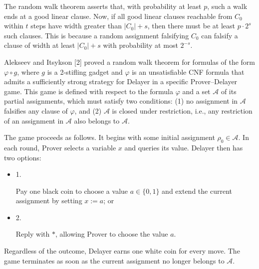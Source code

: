 \documentclass[10pt,a4paper]{article}
\begin{document}
The random walk theorem asserts that, with probability at least $p$, such a walk ends at a good linear clause. Now, if all good linear clauses reachable from $C_{0}$ within $t$ steps have width greater than $|C_{0}|+s$, then there must be at least $p\cdot 2^{s}$ such clauses. This is because a random assignment falsifying $C_{0}$ can falsify a clause of width at least $|C_{0}|+s$ with probability at most $2^{-s}$.\par



Alekseev and Itsykson [2] proved a random walk theorem for formulas of the form $\varphi\circ g$, where $g$ is a 2-stifling gadget and $\varphi$ is an unsatisfiable CNF formula that admits a sufficiently strong strategy for Delayer in a specific Prover–Delayer game. This game is defined with respect to the formula $\varphi$ and a set $\mathcal{A}$ of its partial assignments, which must satisfy two conditions: (1) no assignment in $\mathcal{A}$ falsifies any clause of $\varphi$, and (2) $\mathcal{A}$ is closed under restriction, i.e., any restriction of an assignment in $\mathcal{A}$ also belongs to $\mathcal{A}$.\par



The game proceeds as follows. It begins with some initial assignment $\rho_{0}\in\mathcal{A}$. In each round, Prover selects a variable $x$ and queries its value. Delayer then has two options:\par


\begin{itemize}


\item 
1. 


Pay one black coin to choose a value $a\in\{0,1\}$ and extend the current assignment by setting $x:=a$; or\par





\item 
2. 


Reply with $*$, allowing Prover to choose the value $a$.\par





\end{itemize}


Regardless of the outcome, Delayer earns one white coin for every move. The game terminates as soon as the current assignment no longer belongs to $\mathcal{A}$.\par
\end{document}
